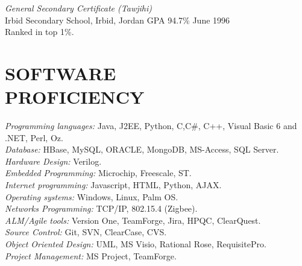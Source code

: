 \documentclass[line,margin]{res}
\begin{document}
\begin{resume}
{\sl General Secondary Certificate (Tawjihi)} \\
Irbid Secondary School, Irbid, Jordan \hspace{0.2in}  GPA 94.7\% \hfill
June 1996 \vspace{0.05in} \\
Ranked in top 1\%.

\section{SOFTWARE \\ PROFICIENCY}
{\sl Programming languages:} Java, J2EE, Python, C,C\#, C++, Visual
Basic 6 and .NET, Perl, Oz. \\
{\sl Database:} HBase, MySQL, ORACLE, MongoDB, MS-Access, SQL Server. \\
{\sl Hardware Design:} Verilog. \\
{\sl Embedded Programming:} Microchip, Freescale, ST. \\
{\sl Internet programming:} Javascript, HTML, Python, AJAX. \\
{\sl Operating systems:} Windows, Linux, Palm OS. \\
{\sl Networks Programming:} TCP/IP, 802.15.4 (Zigbee). \\
{\sl ALM/Agile tools:} Version One, TeamForge, Jira, HPQC, ClearQuest. \\
{\sl Source Control:} Git, SVN, ClearCase, CVS. \\
{\sl Object Oriented Design:} UML, MS Visio, Rational Rose, RequisitePro. \\
{\sl Project Management:} MS Project, TeamForge.


\end{resume}
\end{document}
